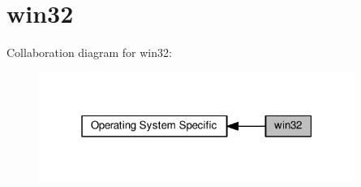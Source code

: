 \hypertarget{group__APACHE__OS__WIN32}{}\section{win32}
\label{group__APACHE__OS__WIN32}
Collaboration diagram for win32\+:
\nopagebreak
\begin{figure}[H]
\begin{center}
\leavevmode
\includegraphics[width=292pt]{group__APACHE__OS__WIN32}
\end{center}
\end{figure}
